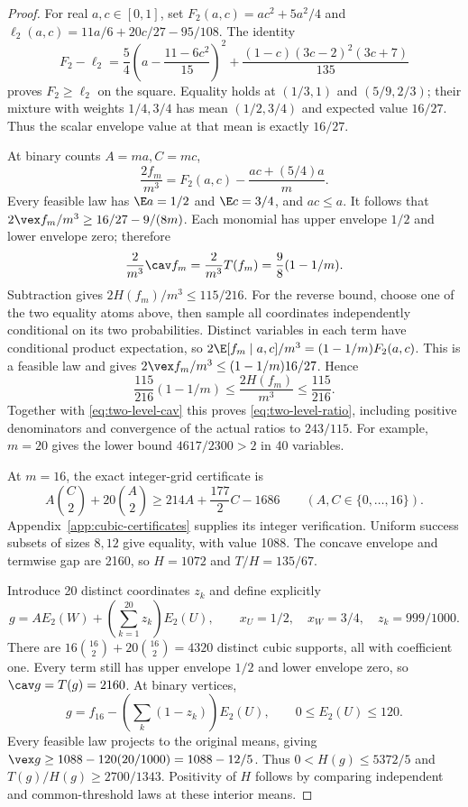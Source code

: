 \begin{proof}
For real $a,c\in[0,1]$, set $F_2(a,c)=ac^2+5a^2/4$ and
$\ell_2(a,c)=11a/6+20c/27-95/108$. The identity
\begin{equation}\label{eq:two-level-scalar}
 F_2-\ell_2=\frac54\left(a-\frac{11-6c^2}{15}\right)^2
       +\frac{(1-c)(3c-2)^2(3c+7)}{135}
\end{equation}
proves $F_2\ge\ell_2$ on the square. Equality holds at $(1/3,1)$ and
$(5/9,2/3)$; their mixture with weights $1/4,3/4$ has mean
$(1/2,3/4)$ and expected value $16/27$. Thus the scalar envelope value
at that mean is exactly $16/27$.

At binary counts $A=ma,C=mc$,
\[
 \frac{2f_m}{m^3}=F_2(a,c)-\frac{ac+(5/4)a}{m}.
\]
Every feasible law has $\E a=1/2$ and $\E c=3/4$, and $ac\le a$.
It follows that $2\vex f_m/m^3\ge16/27-9/(8m)$. Each monomial
has upper envelope $1/2$ and lower envelope zero; therefore
\begin{equation}\label{eq:two-level-cav}
 \frac{2}{m^3}\cav f_m=\frac{2}{m^3}T(f_m)=\frac98(1-1/m).
\end{equation}
Subtraction gives $2H(f_m)/m^3\le115/216$.
For the reverse bound, choose one of the two equality atoms above, then
sample all coordinates independently conditional on its two probabilities.
Distinct variables in each term have conditional product expectation,
so $2\E[f_m\mid a,c]/m^3=(1-1/m)F_2(a,c)$. This is a feasible law and
gives $2\vex f_m/m^3\le(1-1/m)16/27$. Hence
\[
 \frac{115}{216}(1-1/m)\le\frac{2H(f_m)}{m^3}\le\frac{115}{216}.
\]
Together with \eqref{eq:two-level-cav} this proves
\eqref{eq:two-level-ratio}, including positive denominators and convergence
of the actual ratios to $243/115$. For example, $m=20$ gives the lower
bound $4617/2300>2$ in 40 variables.

At $m=16$, the exact integer-grid certificate is
\begin{equation}\label{eq:two-level-16-dual}
 A\binom C2+20\binom A2\ge214A+\frac{177}{2}C-1686
 \qquad(A,C\in\{0,\ldots,16\}).
\end{equation}
Appendix~\ref{app:cubic-certificates} supplies its integer verification.
Uniform success subsets of sizes $8,12$ give equality, with value 1088.
The concave envelope and termwise gap are 2160, so $H=1072$ and
$T/H=135/67$.

Introduce 20 distinct coordinates $z_k$ and define explicitly
\begin{equation}\label{eq:unit-52}
 g=A E_2(W)+\left(\sum_{k=1}^{20}z_k\right)E_2(U),
 \qquad x_U=1/2,\quad x_W=3/4,\quad z_k=999/1000.
\end{equation}
There are $16\binom{16}{2}+20\binom{16}{2}=4320$ distinct cubic
supports, all with coefficient one. Every term still has upper envelope
$1/2$ and lower envelope zero, so $\cav g=T(g)=2160$. At binary vertices,
\[
 g=f_{16}-\left(\sum_k(1-z_k)\right)E_2(U),\qquad
 0\le E_2(U)\le120.
\]
Every feasible law projects to the original means, giving
$\vex g\ge1088-120(20/1000)=1088-12/5$.
Thus $0<H(g)\le5372/5$ and $T(g)/H(g)\ge2700/1343$.
Positivity of $H$ follows by comparing independent and common-threshold
laws at these interior means.
\end{proof}

